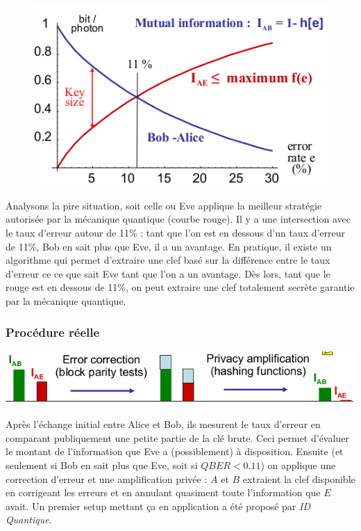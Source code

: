 	\begin{figure}
	\vspace{-5mm}
	\includegraphics[scale=0.35]{ch3/image9}
	\end{figure}
Analysons la pire situation, soit celle ou Eve applique la meilleur stratégie autorisée par la
mécanique quantique (courbe rouge). Il y a une intersection avec le taux d'erreur autour de 
11\% : tant que l'on est en dessous d'un taux d'erreur de 11\%, Bob en sait plus que Eve, il a
un avantage. En pratique, il existe un algorithme qui permet d'extraire une clef basé sur la
différence entre le taux d'erreur ce ce que sait Eve tant que l'on a un avantage. Dès lors, tant
que le rouge est en dessous de 11\%, on peut extraire une clef totalement secrète garantie par
la mécanique quantique.

\subsubsection{Procédure réelle}

\begin{center}
	\includegraphics[scale=0.3]{ch3/image10}
\end{center}

Après l'échange initial entre Alice et Bob, ils mesurent le taux d'erreur en comparant publiquement une petite partie de la clé brute. Ceci permet d'évaluer le montant de l'information que Eve a 
(possiblement) à disposition. Ensuite (et seulement si Bob en sait plus que Eve, soit si 
$QBER<0.11$) on applique une correction d'erreur et une amplification privée : $A$ et $B$ extraient
la clef disponible en corrigeant les erreurs et en annulant quasiment toute l'information que $E$ 
avait. Un premier setup mettant ça en application a été proposé par \textit{ID Quantique}.


